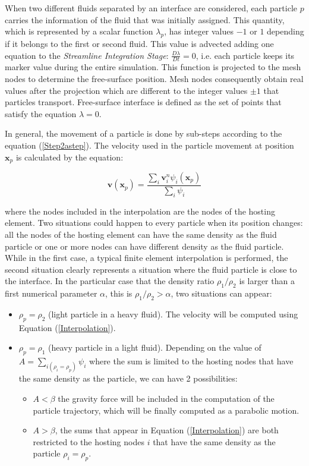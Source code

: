 When two different fluids separated by an interface are considered, each particle $p$ carries the information of the fluid that was initially assigned. This quantity, which is represented by a scalar function $\lambda_p$, has integer values $-1$ or $1$ depending if it belongs to the first or second fluid. This value is advected adding one equation to the \textit{Streamline Integration Stage}: $\frac{D\lambda}{Dt}=0$, i.e. each particle keeps its marker value during the entire simulation. This function is projected to the mesh nodes to determine the free-surface position. Mesh nodes consequently obtain real values after the projection which are different to the integer values $\pm1$ that particles transport. Free-surface interface is defined as the set of points that satisfy the equation $\lambda=0$.

In general, the movement of a particle is done by sub-steps according to the equation (\ref{Step2astep}). The velocity used in the particle movement at position $\mathbf{x}_p$ is calculated by the equation:

\begin{equation}\label{Interpolation}
    \displaystyle \mathbf{v}(\mathbf{x}_p)=\frac{\displaystyle \sum_{i}\mathbf{v}_i^n\psi_i(\mathbf{x}_p)}{\displaystyle \sum_{i}\psi_i}
\end{equation}

where the nodes included in the interpolation are the nodes of the hosting element. Two situations could happen to every particle when its position changes: all the nodes of the hosting element can have the same density as the fluid particle or one or more nodes can have different density as the fluid particle. While in the first case, a typical finite element interpolation is performed, the second situation clearly represents a situation where the fluid particle is close to the interface. In the particular case that the density ratio $\rho_1/\rho_2$ is larger than a first numerical parameter $\alpha$, this is $\rho_1/\rho_2>\alpha$, two situations can appear:

 \begin{itemize}
 \item $\rho_p=\rho_2$ (light particle in a heavy fluid). The velocity will be computed using Equation (\ref{Interpolation}).
   \item $\rho_p=\rho_1$ (heavy particle in a light fluid). Depending on the value of $A=\sum_{i(\rho_i=\rho_p)}\psi_i$ where the sum is limited to the hosting nodes that have the same density as the particle, we can have 2 possibilities:
       \begin{itemize}
 \item $A<\beta$ the gravity force will be included in the computation of the particle trajectory, which will be finally computed as a parabolic motion.
   \item $A>\beta$, the sums that appear in Equation (\ref{Interpolation}) are both restricted to the hosting nodes $i$ that have the same density as the particle $\rho_i=\rho_p$.
 \end{itemize}
 \end{itemize}
 
